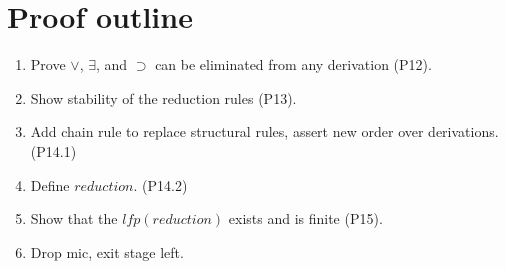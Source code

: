 \documentclass[11pt]{article}
\begin{document}
\begin{prooftree}


\end{prooftree}

\begin{prooftree}


\end{prooftree}

\begin{prooftree}


\end{prooftree}

\begin{prooftree}


\end{prooftree}

\begin{prooftree}


\end{prooftree}

\begin{prooftree}


\end{prooftree}

\section{Proof outline}

\begin{enumerate}
  \item Prove $\vee$, $\exists$, and $\supset$ can be eliminated from
    any derivation (P12).
  \item Show stability of the reduction rules (P13).
  \item Add chain rule to replace structural rules, assert new order
    over derivations. (P14.1)
  \item Define $reduction$. (P14.2)
  \item Show that the $lfp(reduction)$ exists and is finite (P15).
  \item Drop mic, exit stage left.
\end{enumerate}
\end{document}
